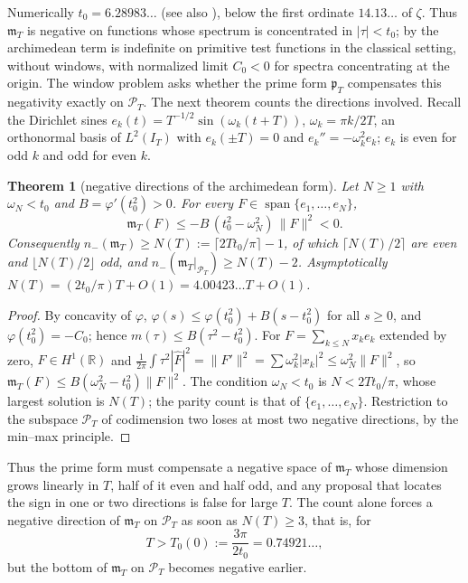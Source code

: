 \documentclass[11pt]{amsart}
\newtheorem{theorem}{Theorem}[section]
\theoremstyle{definition}
\theoremstyle{remark}
\numberwithin{equation}{section}
\newcommand{\R}{\mathbb{R}}
\DeclareMathOperator{\spn}{span}
\newcommand{\IT}{I_T}                                  %
\newcommand{\Fh}{\widehat F}                           %
\newcommand{\PT}{\mathcal{P}_T}                        %
\newcommand{\mT}{\mathfrak{m}_T}                       %
\newcommand{\pT}{\mathfrak{p}_T}                       %
\begin{document}
Numerically $t_0=6.28983\ldots$ (see also \cite[Proposition~3.1]{P17}), below the first ordinate $14.13\ldots$ of
$\zeta$. Thus $\mT$ is negative on functions whose spectrum is concentrated in $|\tau|<t_0$; by
\cite[Proposition~4.1]{P17} the archimedean term is indefinite on primitive test functions in the classical setting,
without windows, with normalized limit $C_0<0$ for spectra concentrating at the origin. The window problem asks whether
the prime form $\pT$ compensates this negativity exactly on $\PT$. The next theorem counts the directions involved.
Recall the Dirichlet sines $e_k(t)=T^{-1/2}\sin(\omega_k(t+T))$, $\omega_k=\pi k/2T$, an orthonormal basis of
$L^2(\IT)$ with $e_k(\pm T)=0$ and $e_k''=-\omega_k^2e_k$; $e_k$ is even for odd $k$ and odd for even $k$.

\begin{theorem}[negative directions of the archimedean form]\label{w2:thm:archcount}
Let $N\ge1$ with $\omega_N<t_0$ and $B=\varphi'(t_0^2)>0$. For every $F\in\spn\{e_1,\dots,e_N\}$,
\[
\mT(F)\le-B\,(t_0^2-\omega_N^2)\,\|F\|^2<0 .
\]
Consequently $n_-(\mT)\ge N(T):=\lceil 2Tt_0/\pi\rceil-1$, of which $\lceil N(T)/2\rceil$ are even and
$\lfloor N(T)/2\rfloor$ odd, and $n_-(\mT|_{\PT})\ge N(T)-2$. Asymptotically $N(T)=(2t_0/\pi)T+O(1)=4.00423\ldots T+O(1)$.
\end{theorem}

\begin{proof}
By concavity of $\varphi$, $\varphi(s)\le\varphi(t_0^2)+B(s-t_0^2)$ for all $s\ge0$, and $\varphi(t_0^2)=-C_0$; hence
$m(\tau)\le B(\tau^2-t_0^2)$. For $F=\sum_{k\le N}x_ke_k$ extended by zero, $F\in H^1(\R)$ and
$\frac1{2\pi}\int\tau^2|\Fh|^2=\|F'\|^2=\sum\omega_k^2|x_k|^2\le\omega_N^2\|F\|^2$, so
$\mT(F)\le B(\omega_N^2-t_0^2)\|F\|^2$. The condition $\omega_N<t_0$ is $N<2Tt_0/\pi$, whose largest solution is
$N(T)$; the parity count is that of $\{e_1,\dots,e_N\}$. Restriction to the subspace $\PT$ of codimension two loses at
most two negative directions, by the min--max principle.
\end{proof}

Thus the prime form must compensate a negative space of $\mT$ whose dimension grows linearly in $T$, half of it even and
half odd, and any proposal that locates the sign in one or two directions is false for large $T$. The count alone forces
a negative direction of $\mT$ on $\PT$ as soon as $N(T)\ge3$, that is, for
\[
T>T_0(0):=\frac{3\pi}{2t_0}=0.74921\ldots ,
\]
but the bottom of $\mT$ on $\PT$ becomes negative earlier.
\end{document}
